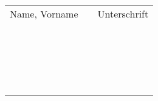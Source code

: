 \begin{tabular}{lcr}
Name, Vorname \hspace{3.75cm} & \hspace{4cm} & \hspace{3.75cm} Unterschrift\\[0.48cm]
\hrulefill & & \hrulefill\\[0.48cm]
\hrulefill & & \hrulefill\\[0.48cm]
\hrulefill & & \hrulefill\\[0.48cm]
\hrulefill & & \hrulefill\\[0.48cm]
\hrulefill & & \hrulefill\\[0.48cm]
\hrulefill & & \hrulefill\\[0.48cm]
\hrulefill & & \hrulefill\\[0.48cm]
\hrulefill & & \hrulefill\\[0.48cm]
\hrulefill & & \hrulefill\\[0.48cm]
\hrulefill & & \hrulefill\\[0.48cm]
\hrulefill & & \hrulefill\\[0.48cm]
\hrulefill & & \hrulefill\\[0.48cm]
\hrulefill & & \hrulefill\\[0.48cm]
\hrulefill & & \hrulefill\\[0.48cm]
\hrulefill & & \hrulefill\\[0.48cm]
\hrulefill & & \hrulefill\\[0.48cm]
\hrulefill & & \hrulefill\\[0.48cm]
\hrulefill & & \hrulefill\\[0.48cm]
\hrulefill & & \hrulefill\\[0.48cm]
\hrulefill & & \hrulefill\\[0.48cm]
\end{tabular}
